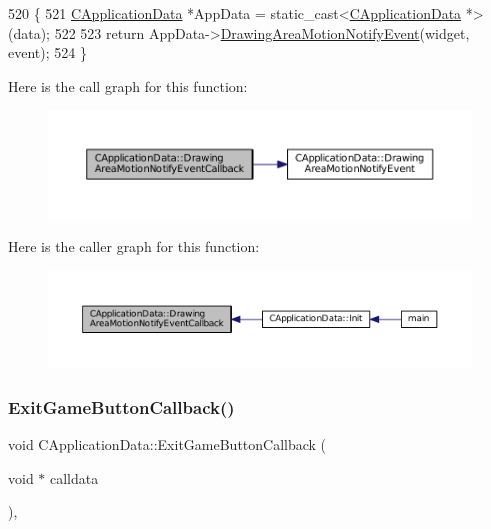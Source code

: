 \begin{DoxyCode}
520                                                                                                            
                 \{
521     \hyperlink{classCApplicationData}{CApplicationData} *AppData = \textcolor{keyword}{static\_cast<}\hyperlink{classCApplicationData}{CApplicationData} *\textcolor{keyword}{>}(data);
522 
523     \textcolor{keywordflow}{return} AppData->\hyperlink{classCApplicationData_a9b53201c01b399df18b02d1e93213e45}{DrawingAreaMotionNotifyEvent}(widget, event);
524 \}
\end{DoxyCode}
Here is the call graph for this function\+:\nopagebreak
\begin{figure}[H]
\begin{center}
\leavevmode
\includegraphics[width=350pt]{classCApplicationData_a463a4bc8eabe67f9f22c46d96f5eff88_cgraph}
\end{center}
\end{figure}
Here is the caller graph for this function\+:\nopagebreak
\begin{figure}[H]
\begin{center}
\leavevmode
\includegraphics[width=350pt]{classCApplicationData_a463a4bc8eabe67f9f22c46d96f5eff88_icgraph}
\end{center}
\end{figure}
\hypertarget{classCApplicationData_a6a2c934fee258ccdb2a4a70c075f79fd}{}\label{classCApplicationData_a6a2c934fee258ccdb2a4a70c075f79fd} 
\subsubsection{\texorpdfstring{Exit\+Game\+Button\+Callback()}{ExitGameButtonCallback()}}
{\footnotesize\ttfamily void C\+Application\+Data\+::\+Exit\+Game\+Button\+Callback (\begin{DoxyParamCaption}\item[{void $\ast$}]{calldata }\end{DoxyParamCaption})\hspace{0.3cm}{\ttfamily [static]}, {\ttfamily [protected]}}



